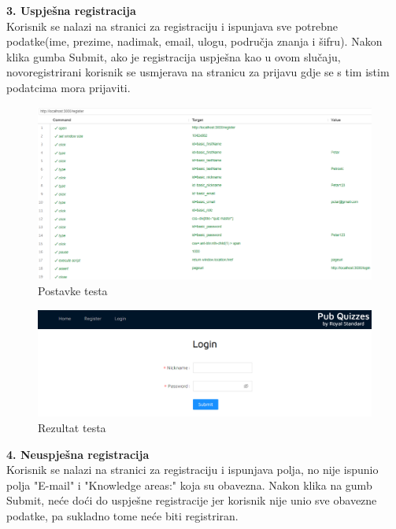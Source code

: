 			\eject

			\textbf{3. Uspješna registracija}\\
				
				Korisnik se nalazi na stranici za registraciju i ispunjava sve potrebne podatke(ime, prezime, nadimak, email, ulogu, područja znanja i šifru). Nakon klika gumba Submit, ako je registracija uspješna kao u ovom slučaju, novoregistrirani korisnik se usmjerava na stranicu za prijavu gdje se s tim istim podatcima mora prijaviti.

				\begin{figure}[H]
					\includegraphics[width=\textwidth]{slike/UspjesnaRegistracija1.PNG} 
					\caption{Postavke testa}
					\label{fig:UspjesnaRegistracija1}
				\end{figure}

				\begin{figure}[H]
					\includegraphics[width=\textwidth]{slike/UspjesnaRegistracija2.PNG} 
					\caption{Rezultat testa}
					\label{fig:UspjesnaRegistracija2}
				\end{figure}
				
			\eject

			\textbf{4. Neuspješna registracija}\\
				
				Korisnik se nalazi na stranici za registraciju i ispunjava polja, no nije ispunio polja "E-mail" i "Knowledge areas:" koja su obavezna. Nakon klika na gumb Submit, neće doći do uspješne registracije jer korisnik nije unio sve obavezne podatke, pa sukladno tome neće biti registriran.

